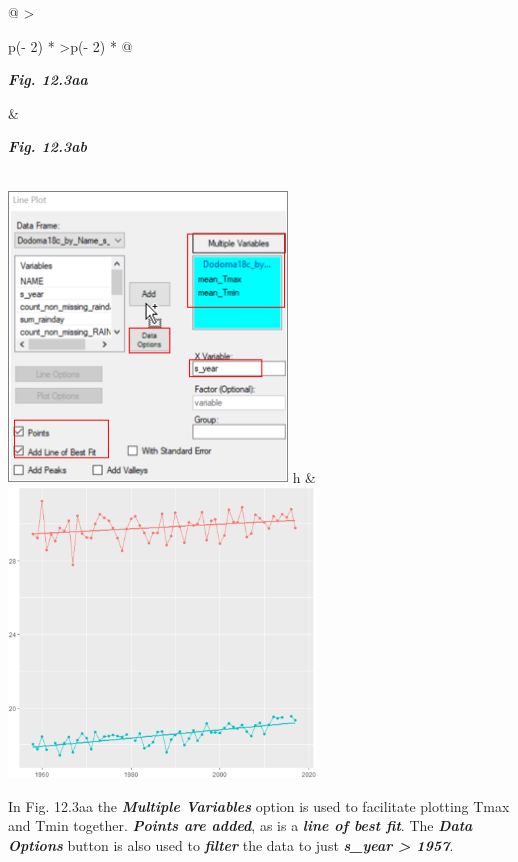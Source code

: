 \documentclass[
  letterpaper,
  DIV=11,
  numbers=noendperiod]{scrreprt}
\begin{document}
\begin{longtable}[]{@{}
  >{\raggedright\arraybackslash}p{(\columnwidth - 2\tabcolsep) * }
  >{\centering\arraybackslash}p{(\columnwidth - 2\tabcolsep) * }@{}}
\toprule\noalign{}
\begin{minipage}[b]{\linewidth}\raggedright
\textbf{\emph{Fig. 12.3aa}}
\end{minipage} & \begin{minipage}[b]{\linewidth}\centering
\textbf{\emph{Fig. 12.3ab}}
\end{minipage} \\
\midrule\noalign{}
\endhead
\bottomrule\noalign{}
\endlastfoot
\includegraphics[width=2.91657in,height=3.03679in]{figures/Fig12.3aa.png}
h &
\includegraphics[width=3.21181in,height=\textheight]{figures/Fig12.3ab.png} \\
\end{longtable}

In Fig. 12.3aa the \textbf{\emph{Multiple Variables}} option is used to
facilitate plotting Tmax and Tmin together. \textbf{\emph{Points are
added}}, as is a \textbf{\emph{line of best fit}}. The
\textbf{\emph{Data Options}} button is also used to
\textbf{\emph{filter}} the data to just \textbf{\emph{s\_year
\textgreater{} 1957}}.
\end{document}
